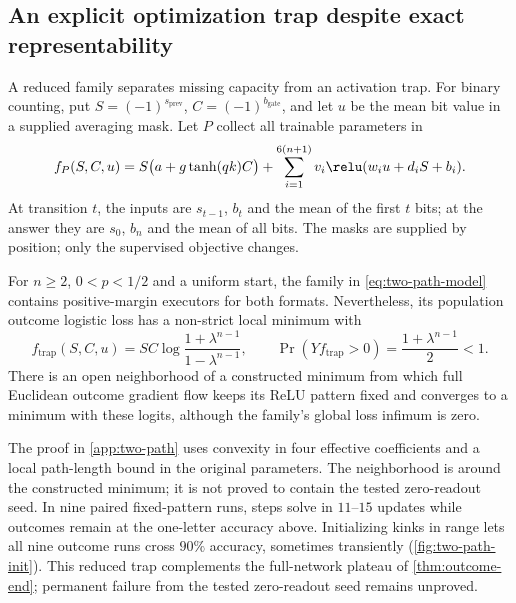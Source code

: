 \subsection{An explicit optimization trap despite exact representability}
\label{sec:two-path-trap}
A reduced family separates missing capacity from an activation trap. For binary
counting, put $S=(-1)^{s_{\mathrm{prev}}}$, $C=(-1)^{b_{\mathrm{gate}}}$,
and let $u$ be the mean bit value in a supplied averaging mask. Let $P$ collect all trainable parameters in
\begin{equation}
 f_P(S,C,u)=S\bigl(a+g\tanh(qk)C\bigr)
 +\sum_{i=1}^{6(n+1)}v_i\relu(w_i u+d_iS+b_i).
 \label{eq:two-path-model}
\end{equation}
At transition $t$, the inputs are $s_{t-1}$, $b_t$ and the mean of the first
$t$ bits; at the answer they are $s_0$, $b_n$ and the mean of all bits.
The masks are supplied by position; only the supervised objective changes.

\begin{proposition}
\label{prop:two-path-trap}
For $n\ge2$, $0<p<1/2$ and a uniform start, the family in
\cref{eq:two-path-model} contains positive-margin executors for both formats.
Nevertheless, its population outcome logistic loss has a non-strict local minimum
with
\[
 f_{\mathrm{trap}}(S,C,u)=S C\log\frac{1+\lambda^{n-1}}{1-\lambda^{n-1}},
 \qquad \Pr(Yf_{\mathrm{trap}}>0)=\frac{1+\lambda^{n-1}}2<1.
\]
There is an open neighborhood of a constructed minimum from which full
Euclidean outcome gradient flow keeps its ReLU pattern fixed and converges
to a minimum with these logits, although the family's global loss infimum is zero.
\end{proposition}
The proof in \cref{app:two-path} uses convexity in four effective coefficients
and a local path-length bound in the original parameters. The neighborhood is
around the constructed minimum; it is not proved to contain the tested zero-readout
seed. In nine paired fixed-pattern runs, steps solve in $11$--$15$ updates while
outcomes remain at the one-letter accuracy above. Initializing kinks in range
lets all nine outcome runs cross $90\%$ accuracy, sometimes transiently
(\cref{fig:two-path-init}). This reduced trap complements the full-network plateau
of \cref{thm:outcome-end}; permanent failure from the tested zero-readout seed remains unproved.

\suppressfloats[t]
